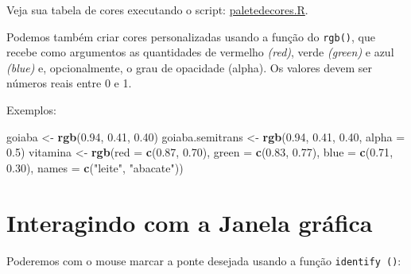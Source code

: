 \documentclass[
]{book}
\newenvironment{Shaded}{\begin{snugshade}}{\end{snugshade}}
\newcommand{\DataTypeTok}[1]{\textcolor[rgb]{0.13,0.29,0.53}{#1}}
\newcommand{\DecValTok}[1]{\textcolor[rgb]{0.00,0.00,0.81}{#1}}
\newcommand{\FloatTok}[1]{\textcolor[rgb]{0.00,0.00,0.81}{#1}}
\newcommand{\KeywordTok}[1]{\textcolor[rgb]{0.13,0.29,0.53}{\textbf{#1}}}
\newcommand{\NormalTok}[1]{#1}
\newcommand{\OperatorTok}[1]{\textcolor[rgb]{0.81,0.36,0.00}{\textbf{#1}}}
\newcommand{\StringTok}[1]{\textcolor[rgb]{0.31,0.60,0.02}{#1}}
\begin{document}
Veja sua tabela de cores executando o script: \href{https://www.dropbox.com/s/e9a27z97buqjovz/paletadecores.R?dl=1}{paletedecores.R}.

Podemos também criar cores personalizadas usando a função do \texttt{rgb()}, que recebe como argumentos as quantidades de vermelho \emph{(red)}, verde \emph{(green)} e azul \emph{(blue)} e, opcionalmente, o grau de opacidade (alpha). Os valores devem ser números reais entre 0 e 1.

Exemplos:

\begin{Shaded}
\begin{Highlighting}[]
\NormalTok{goiaba <-}\StringTok{ }\KeywordTok{rgb}\NormalTok{(}\FloatTok{0.94}\NormalTok{, }\FloatTok{0.41}\NormalTok{, }\FloatTok{0.40}\NormalTok{)}
\NormalTok{goiaba.semitrans <-}\StringTok{ }\KeywordTok{rgb}\NormalTok{(}\FloatTok{0.94}\NormalTok{, }\FloatTok{0.41}\NormalTok{, }\FloatTok{0.40}\NormalTok{, }\DataTypeTok{alpha =} \FloatTok{0.5}\NormalTok{)}
\NormalTok{vitamina <-}\StringTok{ }\KeywordTok{rgb}\NormalTok{(}\DataTypeTok{red =} \KeywordTok{c}\NormalTok{(}\FloatTok{0.87}\NormalTok{, }\FloatTok{0.70}\NormalTok{), }\DataTypeTok{green =} \KeywordTok{c}\NormalTok{(}\FloatTok{0.83}\NormalTok{, }\FloatTok{0.77}\NormalTok{),}
\DataTypeTok{blue =} \KeywordTok{c}\NormalTok{(}\FloatTok{0.71}\NormalTok{, }\FloatTok{0.30}\NormalTok{), }\DataTypeTok{names =} \KeywordTok{c}\NormalTok{(}\StringTok{"leite"}\NormalTok{, }\StringTok{"abacate"}\NormalTok{))}
\end{Highlighting}
\end{Shaded}

\hypertarget{interagindo-com-a-janela-gruxe1fica}{%
\section{Interagindo com a Janela gráfica}\label{interagindo-com-a-janela-gruxe1fica}}

Poderemos com o mouse marcar a ponte desejada usando a função \texttt{identify\ ()}:

\begin{Shaded}
\end{Shaded}
\end{document}
